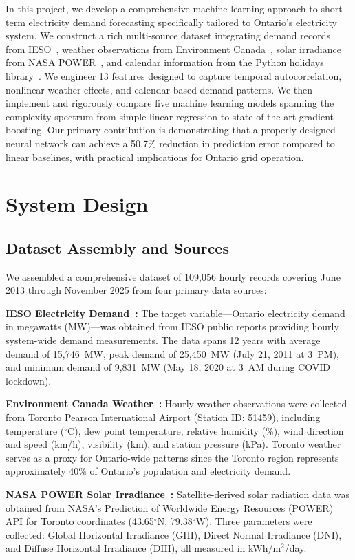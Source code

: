 \documentclass[conference]{IEEEtran}
\begin{document}
In this project, we develop a comprehensive machine learning approach to short-term electricity demand forecasting specifically tailored to Ontario's electricity system. We construct a rich multi-source dataset integrating demand records from IESO~\cite{ieso}, weather observations from Environment Canada~\cite{eccc}, solar irradiance from NASA POWER~\cite{nasa}, and calendar information from the Python holidays library~\cite{holidays}. We engineer 13 features designed to capture temporal autocorrelation, nonlinear weather effects, and calendar-based demand patterns. We then implement and rigorously compare five machine learning models spanning the complexity spectrum from simple linear regression to state-of-the-art gradient boosting. Our primary contribution is demonstrating that a properly designed neural network can achieve a 50.7\% reduction in prediction error compared to linear baselines, with practical implications for Ontario grid operation.

\section{System Design}

\subsection{Dataset Assembly and Sources}

We assembled a comprehensive dataset of 109,056 hourly records covering June 2013 through November 2025 from four primary data sources:

\textbf{IESO Electricity Demand~\cite{ieso}:} The target variable---Ontario electricity demand in megawatts (MW)---was obtained from IESO public reports providing hourly system-wide demand measurements. The data spans 12 years with average demand of 15,746~MW, peak demand of 25,450~MW (July 21, 2011 at 3~PM), and minimum demand of 9,831~MW (May 18, 2020 at 3~AM during COVID lockdown).

\textbf{Environment Canada Weather~\cite{eccc}:} Hourly weather observations were collected from Toronto Pearson International Airport (Station ID: 51459), including temperature ($^\circ$C), dew point temperature, relative humidity (\%), wind direction and speed (km/h), visibility (km), and station pressure (kPa). Toronto weather serves as a proxy for Ontario-wide patterns since the Toronto region represents approximately 40\% of Ontario's population and electricity demand.

\textbf{NASA POWER Solar Irradiance~\cite{nasa}:} Satellite-derived solar radiation data was obtained from NASA's Prediction of Worldwide Energy Resources (POWER) API for Toronto coordinates (43.65$^\circ$N, 79.38$^\circ$W). Three parameters were collected: Global Horizontal Irradiance (GHI), Direct Normal Irradiance (DNI), and Diffuse Horizontal Irradiance (DHI), all measured in kWh/m$^2$/day.
\end{document}
